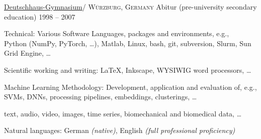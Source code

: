 \documentclass[10pt,a4paper]{article} %
\begin{document}

\headedsection %
{\href{https://www.deutschhaus.de/ }{Deutschhaus-Gymnasium}/\href{https://www.deutschhaus.de/ }{}}
{\textsc{W\"urzburg, Germany}}
{
\headedsubsection %
{Abitur \textnormal{(pre-university secondary education)}}
{1998 -- 2007}
 {}
}

\spacedhrule{0.5em}{-0.4em} %


\inlineheadsection
{Technical:}
{
    Various Software Languages, packages and environments, e.g.,\\
    Python (NumPy, PyTorch, \dots), Matlab, Linux, bash, git, subversion, Slurm, Sun Grid Engine, \dots
}

\vspace{5pt}
\inlineheadsection
{Scientific working and writing:}
{
        LaTeX, Inkscape, WYSIWIG word processors, \dots
}

\vspace{5pt}
\inlineheadsection
{Machine Learning Methodology:}
{
        Development, application and evaluation of, e.g.,\\
        SVMs, DNNs, processing pipelines, embeddings, clusterings, \dots
}

\vspace{5pt}
{
       text, audio, video, images, time series, biomechanical and biomedical data, \dots
}



\vspace{5pt}
\inlineheadsection %
{Natural languages:}
{
    German \textit{(native)}, English \textit{(full professional proficiency)}
}

\end{document}
